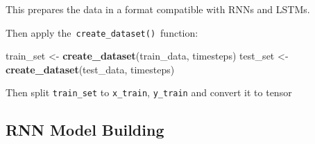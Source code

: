 \documentclass[
]{article}
\newenvironment{Shaded}{\begin{snugshade}}{\end{snugshade}}
\newcommand{\AttributeTok}[1]{\textcolor[rgb]{0.13,0.29,0.53}{#1}}
\newcommand{\CommentTok}[1]{\textcolor[rgb]{0.56,0.35,0.01}{\textit{#1}}}
\newcommand{\DecValTok}[1]{\textcolor[rgb]{0.00,0.00,0.81}{#1}}
\newcommand{\FunctionTok}[1]{\textcolor[rgb]{0.13,0.29,0.53}{\textbf{#1}}}
\newcommand{\NormalTok}[1]{#1}
\newcommand{\OtherTok}[1]{\textcolor[rgb]{0.56,0.35,0.01}{#1}}
\newcommand{\SpecialCharTok}[1]{\textcolor[rgb]{0.81,0.36,0.00}{\textbf{#1}}}
\newcommand{\StringTok}[1]{\textcolor[rgb]{0.31,0.60,0.02}{#1}}
\begin{document}
This prepares the data in a format compatible with RNNs and LSTMs.

Then apply the~\texttt{create\_dataset()}~function:

\begin{Shaded}
\begin{Highlighting}[]
\NormalTok{train\_set }\OtherTok{\textless{}{-}} \FunctionTok{create\_dataset}\NormalTok{(train\_data, timesteps)}
\NormalTok{test\_set }\OtherTok{\textless{}{-}} \FunctionTok{create\_dataset}\NormalTok{(test\_data, timesteps)}
\end{Highlighting}
\end{Shaded}

Then split \texttt{train\_set} to \texttt{x\_train}, \texttt{y\_train}
and convert it to tensor

\begin{Shaded}
\end{Shaded}

\subsection{RNN Model Building}\label{rnn-model-building}
\end{document}
